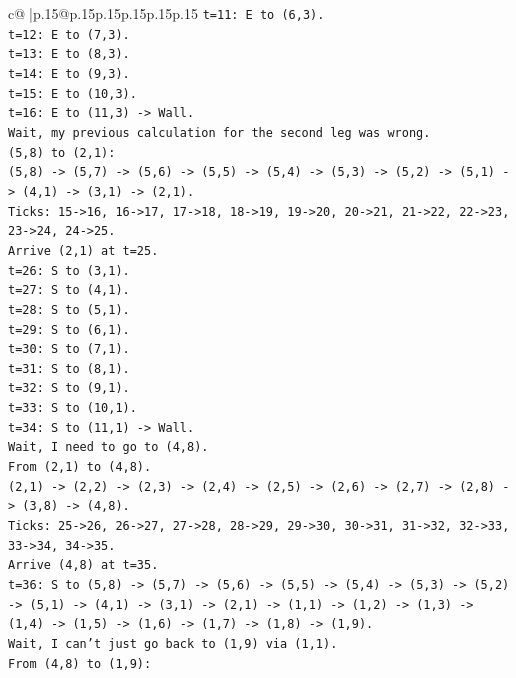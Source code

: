 \documentclass{article}
\begin{document}
{\begin{supertabular}{c@{$\;$}|p{.15\linewidth}@{}p{.15\linewidth}p{.15\linewidth}p{.15\linewidth}p{.15\linewidth}p{.15\linewidth}}
{{{\texttt{t=11: E to (6,3).} \\
\texttt{t=12: E to (7,3).} \\
\texttt{t=13: E to (8,3).} \\
\texttt{t=14: E to (9,3).} \\
\texttt{t=15: E to (10,3).} \\
\texttt{t=16: E to (11,3) {-}> Wall.} \\
\texttt{Wait, my previous calculation for the second leg was wrong.} \\
\texttt{(5,8) to (2,1):} \\
\texttt{(5,8) {-}> (5,7) {-}> (5,6) {-}> (5,5) {-}> (5,4) {-}> (5,3) {-}> (5,2) {-}> (5,1) {-}> (4,1) {-}> (3,1) {-}> (2,1).} \\
\texttt{Ticks: 15{-}>16, 16{-}>17, 17{-}>18, 18{-}>19, 19{-}>20, 20{-}>21, 21{-}>22, 22{-}>23, 23{-}>24, 24{-}>25.} \\
\texttt{Arrive (2,1) at t=25.} \\
\texttt{t=26: S to (3,1).} \\
\texttt{t=27: S to (4,1).} \\
\texttt{t=28: S to (5,1).} \\
\texttt{t=29: S to (6,1).} \\
\texttt{t=30: S to (7,1).} \\
\texttt{t=31: S to (8,1).} \\
\texttt{t=32: S to (9,1).} \\
\texttt{t=33: S to (10,1).} \\
\texttt{t=34: S to (11,1) {-}> Wall.} \\
\texttt{Wait, I need to go to (4,8).} \\
\texttt{From (2,1) to (4,8).} \\
\texttt{(2,1) {-}> (2,2) {-}> (2,3) {-}> (2,4) {-}> (2,5) {-}> (2,6) {-}> (2,7) {-}> (2,8) {-}> (3,8) {-}> (4,8).} \\
\texttt{Ticks: 25{-}>26, 26{-}>27, 27{-}>28, 28{-}>29, 29{-}>30, 30{-}>31, 31{-}>32, 32{-}>33, 33{-}>34, 34{-}>35.} \\
\texttt{Arrive (4,8) at t=35.} \\
\texttt{t=36: S to (5,8) {-}> (5,7) {-}> (5,6) {-}> (5,5) {-}> (5,4) {-}> (5,3) {-}> (5,2) {-}> (5,1) {-}> (4,1) {-}> (3,1) {-}> (2,1) {-}> (1,1) {-}> (1,2) {-}> (1,3) {-}> (1,4) {-}> (1,5) {-}> (1,6) {-}> (1,7) {-}> (1,8) {-}> (1,9).} \\
\texttt{Wait, I can't just go back to (1,9) via (1,1).} \\
\texttt{From (4,8) to (1,9):} \\
}}}
\end{supertabular}}
\end{document}
